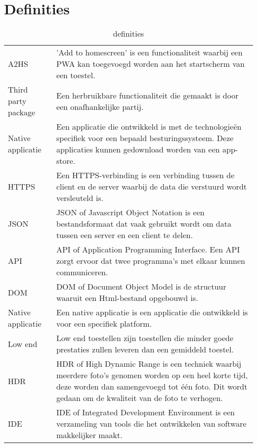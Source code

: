 \chapter*{Definities}
\begin{table}[H]
	\begin{tabular}{p{3cm}p{10cm}}
		A2HS & 'Add to homescreen' is een functionaliteit waarbij een PWA kan toegevoegd worden aan het startscherm van een toestel.\\
		Third party package & Een herbruikbare functionaliteit die gemaakt is door een onafhankelijke partij.\\
		Native applicatie & Een applicatie die ontwikkeld is met de technologieën specifiek voor een bepaald besturingssysteem. Deze applicaties kunnen gedownload worden van een app-store.\\
		HTTPS & Een HTTPS-verbinding is een verbinding tussen de client en de server waarbij de data die verstuurd wordt versleuteld is. \\
		JSON &  JSON of Javascript Object Notation is een bestandsformaat dat vaak gebruikt wordt om data tussen een server en een client te delen. \\
		API &  API of Application Programming Interface. Een API zorgt ervoor dat twee programma’s met elkaar kunnen communiceren.\\
		DOM & DOM of Document Object Model is de structuur waaruit een Html-bestand opgebouwd is. \\
		Native applicatie &  Een native applicatie is een applicatie die ontwikkeld is voor een specifiek platform.\\
		Low end & Low end toestellen zijn toestellen die minder goede prestaties zullen leveren dan een gemiddeld toestel. \\
		HDR & HDR of High Dynamic Range is een techniek waarbij meerdere foto’s genomen worden op een heel korte tijd, deze worden dan samengevoegd tot één foto. Dit wordt gedaan om de kwaliteit van de foto te verhogen. \\
		IDE & IDE of Integrated Development Environment is een verzameling van tools die het ontwikkelen van software makkelijker maakt.
	\end{tabular}	
	\caption{definities }
\end{table}
\newpage